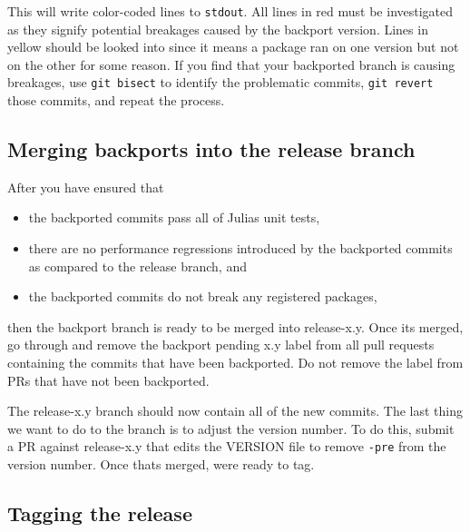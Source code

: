 This will write color-coded lines to \texttt{stdout}. All lines in red must be investigated as they signify potential breakages caused by the backport version. Lines in yellow should be looked into since it means a package ran on one version but not on the other for some reason. If you find that your backported branch is causing breakages, use \texttt{git bisect} to identify the problematic commits, \texttt{git revert} those commits, and repeat the process.



\hypertarget{10606148317076151231}{}


\subsection{Merging backports into the release branch}



After you have ensured that



\begin{itemize}
\item the backported commits pass all of Julia{\textquotesingle}s unit tests,


\item there are no performance regressions introduced by the backported commits as compared to the release branch, and


\item the backported commits do not break any registered packages,

\end{itemize}


then the backport branch is ready to be merged into release-x.y. Once it{\textquotesingle}s merged, go through and remove the {\textquotedbl}backport pending x.y{\textquotedbl} label from all pull requests containing the commits that have been backported. Do not remove the label from PRs that have not been backported.



The release-x.y branch should now contain all of the new commits. The last thing we want to do to the branch is to adjust the version number. To do this, submit a PR against release-x.y that edits the VERSION file to remove \texttt{-pre} from the version number. Once that{\textquotesingle}s merged, we{\textquotesingle}re ready to tag.



\hypertarget{17687518186078684350}{}


\subsection{Tagging the release}



